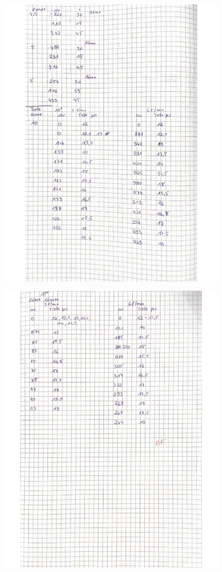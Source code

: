 \begin{figure}[H]
  \centering
  \includegraphics[width=\textwidth]{content/Messdaten/US3_2.pdf}
  \label{fig:Messungen_2}
\end{figure}
\begin{figure}[H]
  \centering
  \includegraphics[width=\textwidth]{content/Messdaten/US3_3.pdf}
  \label{fig:Messungen_3}
\end{figure}